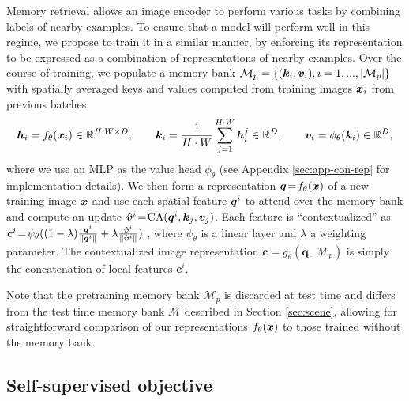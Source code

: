 \documentclass{article}
\begin{document}
Memory retrieval allows an image encoder to perform various tasks by combining labels of nearby examples. To ensure that a model will perform well in this regime, we propose to train it in a similar manner, by enforcing its representation to be expressed as a combination of representations of nearby examples. Over the course of training, we populate a memory bank $\mathcal{M}_p = \{ ({\bm{k}}_i, {\bm{v}}_i), i=1,...,|\mathcal{M}_p| \}$ with spatially averaged keys and values computed from training images ${\bm{x}}_i$ from previous batches: 
\begin{equation}
\label{eq:mem}
{\bm{h}}_i = f_\theta({\bm{x}}_i) \in \mathbb{R}^{H \cdot W \times D}, \qquad 
{\bm{k}}_i = \frac{1}{H \cdot W}\sum_{j=1}^{H \cdot W} {\bm{h}}_i^j \in \mathbb{R}^D, \qquad 
{\bm{v}}_i = \phi_\theta({\bm{k}}_i) \in \mathbb{R}^D,
\end{equation}
where we use an MLP as the value head $\phi_\theta$ (see Appendix \ref{sec:app-con-rep} for implementation details).
We then form a representation ${\bm{q}} \!=\! f_\theta({\bm{x}})$ of a new training image ${\bm{x}}$ and use each spatial feature ${\bm{q}}^i$ to attend over the memory bank and compute an update $\bm{\hat{v}}^{i} \!=\! \text{CA}({\bm{q}}^i, {\bm{k}}_j, {\bm{v}}_j)$.
Each feature is ``contextualized'' as 
$ \bm{c}^{i} \!=\! \psi_\theta((1-\lambda) \frac{{\bm{q}}^i}{ \lVert {\bm{q}}^i \rVert } + \lambda \frac{\bm{\hat{v}}^{i}}{ \lVert \bm{\hat{v}}^{i} \rVert } )$
, where $\psi_\theta$ is a linear layer and $\lambda$ a weighting parameter. The contextualized image representation $\bm{c} \!=\! g_\theta( \bm{q}, \ \mathcal{M}_p )$ is simply the concatenation of local features $ \bm{c}^{i}$. 

Note that the pretraining memory bank $\mathcal{M}_p$ is discarded at test time and differs from the test time memory bank $\mathcal{M}$ described in Section \ref{sec:scene}, allowing for straightforward comparison of our representations $f_\theta({\bm{x}})$ to those trained without the memory bank. 

\subsection{Self-supervised objective} \label{sec:ssl}
\end{document}
